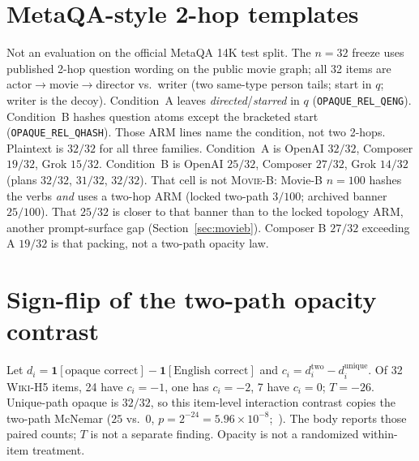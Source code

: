 \documentclass{article}
\begin{document}
\FloatBarrier
\section{MetaQA-style 2-hop templates}
\label{app:extended}
\label{app:metaqa32}

Not an evaluation on the official MetaQA 14K test split.
The $n{=}32$ freeze uses published 2-hop question wording on the public
movie graph; all 32 items are actor$\to$movie$\to$director vs.\ writer
(two same-type person tails; start in $q$; writer is the decoy).
Condition~A leaves \emph{directed}/\emph{starred} in $q$
(\texttt{OPAQUE\_REL\_QENG}).
Condition~B hashes question atoms except the bracketed start
(\texttt{OPAQUE\_REL\_QHASH}).
Those ARM lines name the condition, not two 2-hops.
Plaintext is $32/32$ for all three families.
Condition~A is OpenAI $32/32$, Composer $19/32$, Grok $15/32$.
Condition~B is OpenAI $25/32$, Composer $27/32$, Grok $14/32$
(plans $32/32$, $31/32$, $32/32$).
That cell is not \textsc{Movie-B}: Movie-B $n{=}100$ hashes the verbs
\emph{and} uses a two-hop ARM (locked two-path $3/100$; archived banner
$25/100$).
That $25/32$ is closer to that banner than to the locked topology
ARM, another prompt-surface gap
(Section~\ref{sec:movieb}).
Composer B $27/32$ exceeding A $19/32$ is that packing, not a two-path
opacity law.

\section{Sign-flip of the two-path opacity contrast}
\label{app:signflip}

Let $d_i=\mathbf{1}[\text{opaque correct}]-\mathbf{1}[\text{English correct}]$
and $c_i=d^{\mathrm{two}}_i-d^{\mathrm{unique}}_i$.
Of 32 \textsc{Wiki-H5} items, 24 have $c_i{=}{-1}$, one has $c_i{=}{-2}$,
7 have $c_i{=}0$; $T{=}{-}26$.
Unique-path opaque is $32/32$, so this item-level interaction contrast
copies the two-path McNemar ($25$ vs.\ $0$,
$p{=}2^{-24}{=}5.96{\times}10^{-8}$;~\citealp{mcnemar1947}).
The body reports those paired counts; $T$ is not a separate finding.
Opacity is not a randomized within-item treatment.

\clearpage

\end{document}
